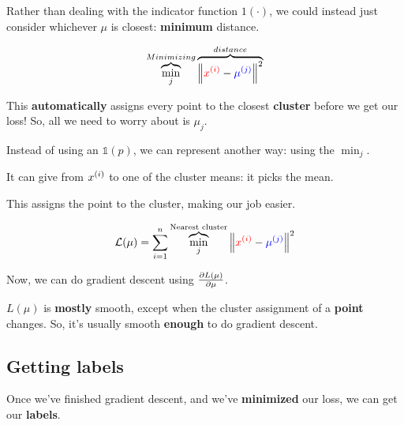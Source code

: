         Rather than dealing with the indicator function $1(\cdot)$, we could instead just consider whichever $\mu$ is closest: \textbf{minimum} distance.
        
        \begin{equation}
            \overbrace{
                \min_{j} 
            }^{Minimizing}
            \overbrace{
                \left\lVert \textcolor{red}{x^{(i)} } - \textcolor{blue}{\mu^{(j)}} \right\rVert^2 
            }^{distance}
        \end{equation}
        
        This \textbf{automatically} assigns every point to the closest \textbf{cluster} before we get our loss! So, all we need to worry about is $\mu_j$.
        
        \begin{notation}
            Instead of using an  $\mathbb{1}(p)$, we can represent  another way: using the  $\min_{j}$.
            
            It can give  from $x^{(i)}$ to one of the cluster means: it picks the  mean. 
            
            This  assigns the point to the  cluster, making our job easier.
        \end{notation}
        
        \begin{equation}
            \mathcal{L}(\mu) =
            \sum_{i=1}^n 
            \overbrace{
                    \min_{j} 
            }^{\text{Nearest cluster}}
                    \left\lVert \textcolor{red}{x^{(i)} } - \textcolor{blue}{\mu^{(j)}} \right\rVert^2
        \end{equation}
        
        Now, we can do gradient descent using $\frac{\partial L(\mu)}{\partial \mu}$. 
        
        $L(\mu)$ is \textbf{mostly} smooth, except when the cluster assignment of a \textbf{point} changes. So, it's usually smooth \textbf{enough} to do gradient descent.
    
    \subsection{Getting labels}
        
        Once we've finished gradient descent, and we've \textbf{minimized} our loss, we can get our \textbf{labels}.
        
